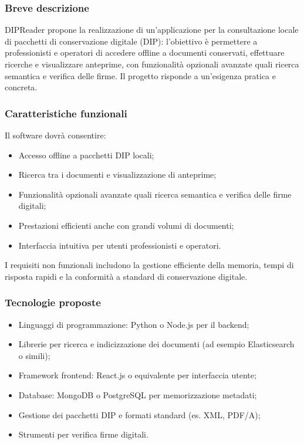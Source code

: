 \documentclass[a4paper,11pt]{article}
\begin{document}
\subsubsection{Breve descrizione}
DIPReader propone la realizzazione di un'applicazione per la consultazione locale di pacchetti di conservazione digitale (DIP): l'obiettivo è permettere a professionisti e operatori di accedere offline a documenti conservati, effettuare ricerche e visualizzare anteprime, con funzionalità opzionali avanzate quali ricerca semantica e verifica delle firme. Il progetto risponde a un'esigenza pratica e concreta.

\subsubsection{Caratteristiche funzionali}
Il software dovrà consentire:
\begin{itemize}[leftmargin=*]
    \item Accesso offline a pacchetti DIP locali;
    \item Ricerca tra i documenti e visualizzazione di anteprime;
    \item Funzionalità opzionali avanzate quali ricerca semantica e verifica delle firme digitali;
    \item Prestazioni efficienti anche con grandi volumi di documenti;
    \item Interfaccia intuitiva per utenti professionisti e operatori.
\end{itemize}
I requisiti non funzionali includono la gestione efficiente della memoria, tempi di risposta rapidi e la conformità a standard di conservazione digitale.

\subsubsection{Tecnologie proposte}
\begin{itemize}[leftmargin=*]
    \item Linguaggi di programmazione: Python o Node.js per il backend;
    \item Librerie per ricerca e indicizzazione dei documenti (ad esempio Elasticsearch o simili);
    \item Framework frontend: React.js o equivalente per interfaccia utente;
    \item Database: MongoDB o PostgreSQL per memorizzazione metadati;
    \item Gestione dei pacchetti DIP e formati standard (es. XML, PDF/A);
    \item Strumenti per verifica firme digitali.
\end{itemize}
\end{document}
